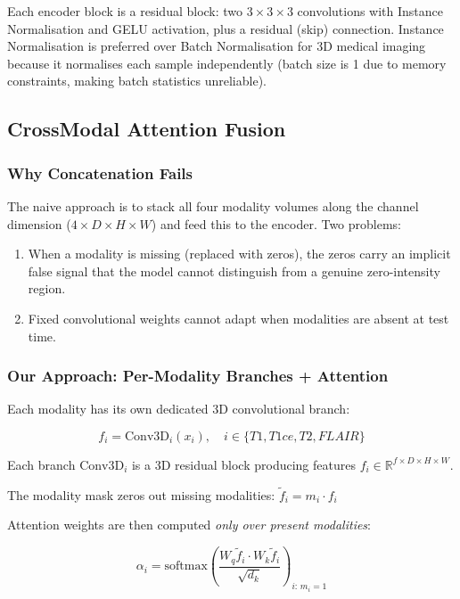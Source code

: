 \documentclass[12pt,a4paper]{article}
\begin{document}
Each encoder block is a residual block: two $3\times3\times3$ convolutions with Instance Normalisation and GELU activation, plus a residual (skip) connection. Instance Normalisation is preferred over Batch Normalisation for 3D medical imaging because it normalises each sample independently (batch size is 1 due to memory constraints, making batch statistics unreliable).

\subsection{CrossModal Attention Fusion}

\subsubsection{Why Concatenation Fails}

The naive approach is to stack all four modality volumes along the channel dimension ($4 \times D \times H \times W$) and feed this to the encoder. Two problems:

\begin{enumerate}[noitemsep]
  \item When a modality is missing (replaced with zeros), the zeros carry an implicit false signal that the model cannot distinguish from a genuine zero-intensity region.
  \item Fixed convolutional weights cannot adapt when modalities are absent at test time.
\end{enumerate}

\subsubsection{Our Approach: Per-Modality Branches + Attention}

Each modality has its own dedicated 3D convolutional branch:

\[
f_i = \text{Conv3D}_i(x_i), \quad i \in \{T1, T1ce, T2, FLAIR\}
\]

Each branch $\text{Conv3D}_i$ is a 3D residual block producing features $f_i \in \mathbb{R}^{f \times D \times H \times W}$.

The modality mask zeros out missing modalities: $\tilde{f}_i = m_i \cdot f_i$

Attention weights are then computed \emph{only over present modalities}:

\[
\alpha_i = \text{softmax}\!\left(\frac{W_q \tilde{f}_i \cdot W_k \tilde{f}_i}{\sqrt{d_k}}\right)_{i:\,m_i=1}
\]
\end{document}
